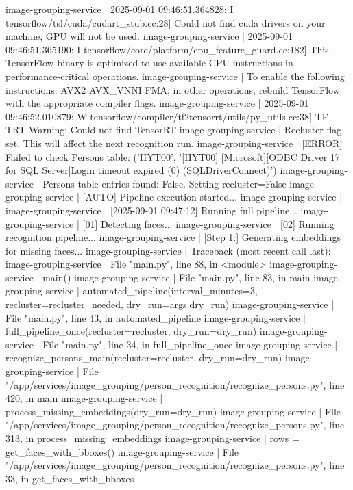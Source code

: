image-grouping-service  | 2025-09-01 09:46:51.364828: I tensorflow/tsl/cuda/cudart_stub.cc:28] Could not find cuda drivers on your machine, GPU will not be used.
image-grouping-service  | 2025-09-01 09:46:51.365190: I tensorflow/core/platform/cpu_feature_guard.cc:182] This TensorFlow binary is optimized to use available CPU instructions in performance-critical operations.
image-grouping-service  | To enable the following instructions: AVX2 AVX_VNNI FMA, in other operations, rebuild TensorFlow with the appropriate compiler flags.
image-grouping-service  | 2025-09-01 09:46:52.010879: W tensorflow/compiler/tf2tensorrt/utils/py_utils.cc:38] TF-TRT Warning: Could not find TensorRT
image-grouping-service  | Recluster flag set. This will affect the next recognition run.
image-grouping-service  | [ERROR] Failed to check Persons table: ('HYT00', '[HYT00] [Microsoft][ODBC Driver 17 for SQL Server]Login timeout expired (0) (SQLDriverConnect)')
image-grouping-service  | Persons table entries found: False. Setting recluster=False
image-grouping-service  | [AUTO] Pipeline execution started...
image-grouping-service  |
image-grouping-service  | [2025-09-01 09:47:12] Running full pipeline...
image-grouping-service  | [01] Detecting faces...
image-grouping-service  | [02] Running recognition pipeline...
image-grouping-service  | [Step 1:] Generating embeddings for missing faces...
image-grouping-service  | Traceback (most recent call last):
image-grouping-service  |   File "main.py", line 88, in <module>
image-grouping-service  |     main()
image-grouping-service  |   File "main.py", line 83, in main
image-grouping-service  |     automated_pipeline(interval_minutes=3, recluster=recluster_needed, dry_run=args.dry_run)
image-grouping-service  |   File "main.py", line 43, in automated_pipeline
image-grouping-service  |     full_pipeline_once(recluster=recluster, dry_run=dry_run)
image-grouping-service  |   File "main.py", line 34, in full_pipeline_once
image-grouping-service  |     recognize_persons_main(recluster=recluster, dry_run=dry_run)
image-grouping-service  |   File "/app/services/image_grouping/person_recognition/recognize_persons.py", line 420, in main
image-grouping-service  |     process_missing_embeddings(dry_run=dry_run)
image-grouping-service  |   File "/app/services/image_grouping/person_recognition/recognize_persons.py", line 313, in process_missing_embeddings
image-grouping-service  |     rows = get_faces_with_bboxes()
image-grouping-service  |   File "/app/services/image_grouping/person_recognition/recognize_persons.py", line 33, in get_faces_with_bboxes
